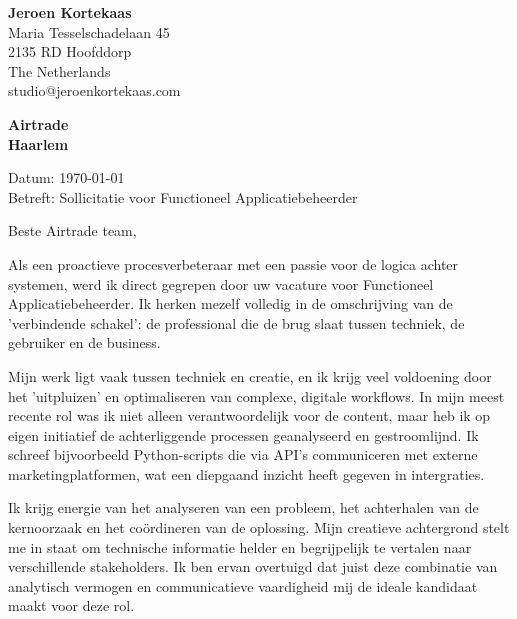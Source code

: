 \documentclass[10pt,a4paper]{article}
\begin{document}
\fontsize{9}{15}\selectfont

\noindent
\hfill
\begin{minipage}[t]{0.5\textwidth}
\raggedleft
\textbf{Jeroen Kortekaas} \\
Maria Tesselschadelaan 45 \\
2135 RD Hoofddorp \\
The Netherlands \\
studio@jeroenkortekaas.com \\
\end{minipage}

\vspace{1.5em}

\begin{adjustwidth}{15mm}{15mm}

\textbf{Airtrade} \\
\textbf{Haarlem} \\
\vspace{1.5em}

Datum: \today \\
Betreft: Sollicitatie voor Functioneel Applicatiebeheerder \\

\vspace{1.5em}

Beste Airtrade team,

Als een proactieve procesverbeteraar met een passie voor de logica achter systemen, werd ik direct gegrepen door uw vacature voor Functioneel Applicatiebeheerder. Ik herken mezelf volledig in de omschrijving van de 'verbindende schakel': de professional die de brug slaat tussen techniek, de gebruiker en de business.

Mijn werk ligt vaak tussen techniek en creatie, en ik krijg veel voldoening door het 'uitpluizen' en optimaliseren van complexe, digitale workflows. In mijn meest recente rol was ik niet alleen verantwoordelijk voor de content, maar heb ik op eigen initiatief de achterliggende processen geanalyseerd en gestroomlijnd. Ik schreef bijvoorbeeld Python-scripts die via API's communiceren met externe marketingplatformen, wat een diepgaand inzicht heeft gegeven in intergraties.

Ik krijg energie van het analyseren van een probleem, het achterhalen van de kernoorzaak en het coördineren van de oplossing. Mijn creatieve achtergrond stelt me in staat om technische informatie helder en begrijpelijk te vertalen naar verschillende stakeholders. Ik ben ervan overtuigd dat juist deze combinatie van analytisch vermogen en communicatieve vaardigheid mij de ideale kandidaat maakt voor deze rol.


\end{adjustwidth}
\end{document}
